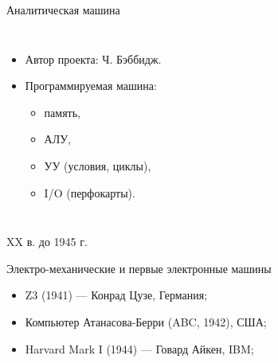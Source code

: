 \begin{frame}{Аналитическая машина}
    \begin{columns}
    \column{4.8cm}

    \column{6.5cm}
    \begin{itemize}
    \item Автор проекта: Ч. Бэббидж.
    \item Программируемая машина:
        \begin{itemize}
            \item память, \item АЛУ,\item УУ (условия, циклы),
            \item I/O (перфокарты).
        \end{itemize}
    \end{itemize}
    \end{columns}
\end{frame}

\begin{frame}{XX в. до 1945 г.}
\pause
\begin{block}{Электро-механические и первые электронные машины}
\begin{itemize}\itemsep=1cm
    \item Z3 (1941) — Конрад Цузе, Германия;
        \\ 
    \item Компьютер Атанасова-Берри (ABC, 1942), США;
        \\ 

    \item Harvard Mark I (1944) — Говард Айкен, IBM;
        \\ 

\end{itemize}
\end{block}
\end{frame}

